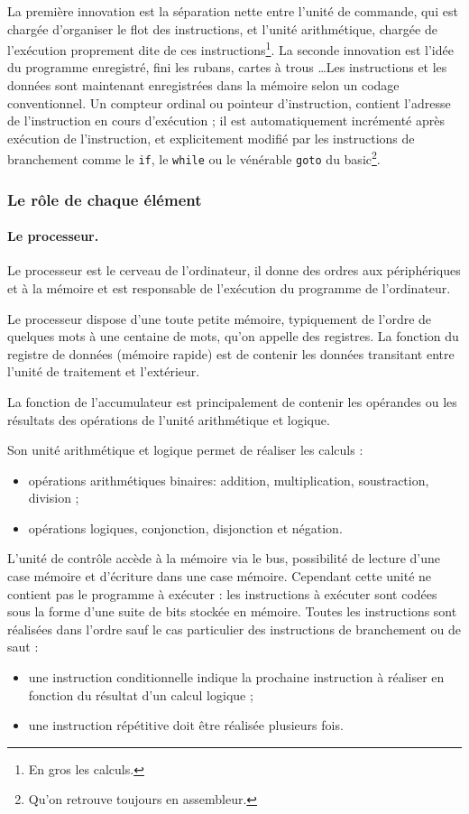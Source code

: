 \par La première innovation est la séparation nette entre l'unité de commande, qui est chargée d'organiser le flot des instructions, et l'unité arithmétique, chargée de l'exécution proprement dite de ces instructions\footnote{En gros les calculs.}. La seconde innovation est l'idée du programme enregistré, fini les rubans, cartes à trous \dots Les instructions et les données sont maintenant enregistrées dans la mémoire selon un codage conventionnel. Un compteur ordinal ou pointeur d'instruction, contient l'adresse de l'instruction en cours d'exécution ; il est automatiquement incrémenté après exécution de l'instruction, et explicitement modifié par les instructions de branchement comme le \lstinline?if?, le \lstinline?while? ou le vénérable \lstinline?goto? du basic\footnote{Qu'on retrouve toujours en assembleur.}.
\subsubsection{Le rôle de chaque élément}
\paragraph{Le processeur.}
Le processeur est le cerveau de l'ordinateur, il donne des ordres aux périphériques et à la mémoire et est responsable de l'exécution du programme de l'ordinateur.\par
Le processeur dispose d'une toute petite mémoire, typiquement de l'ordre de quelques mots à une centaine de mots, qu'on appelle des registres. La fonction du registre de données (mémoire rapide) est de contenir les données transitant entre l'unité de traitement et l'extérieur.\par
 La fonction de l'accumulateur est principalement de contenir les opérandes ou les résultats des opérations de l'unité arithmétique et logique.\par
Son unité arithmétique et logique permet de réaliser les calculs :
\begin{itemize}
\item opérations arithmétiques binaires: addition, multiplication, soustraction, division ;
\item opérations logiques, conjonction, disjonction et négation.
\end{itemize}
L'unité de contrôle accède à la mémoire via le bus, possibilité de lecture d'une case mémoire et d'écriture dans une case mémoire. Cependant cette unité ne contient pas le programme à exécuter : les instructions à exécuter sont codées sous la forme d'une suite de bits stockée en mémoire. Toutes les instructions sont réalisées dans l'ordre sauf le cas particulier des instructions de branchement ou de saut :
\begin{itemize}
\item une instruction conditionnelle indique la prochaine instruction à réaliser en fonction du résultat d'un calcul logique ;
\item une instruction répétitive doit être réalisée plusieurs fois.
\end{itemize}
